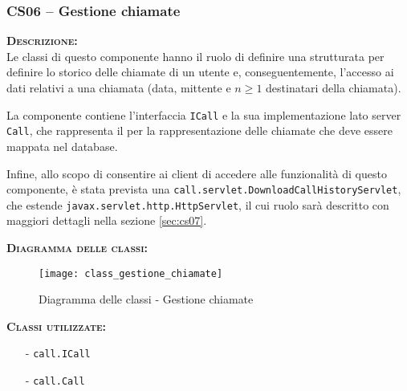 
\subsubsection{CS06 -- Gestione chiamate}\label{sec:cs06}
\begin{description}
  \item{\scshape\bfseries Descrizione:}\\
Le classi di questo componente hanno il ruolo di definire una strutturata   per definire lo storico delle chiamate di un utente e, conseguentemente, l'accesso ai dati relativi a una chiamata (data, mittente e $n\geq1$ destinatari della chiamata).

La componente contiene l'interfaccia \texttt{ICall} e la sua implementazione lato server \texttt{Call}, che rappresenta il  per la rappresentazione delle chiamate che deve essere mappata nel database.

Infine, allo scopo di consentire ai client di accedere alle funzionalità di questo componente, è stata prevista una  \texttt{call.servlet.DownloadCallHistoryServlet}, che estende \texttt{javax.servlet.http.HttpServlet}, il cui ruolo sarà descritto con maggiori dettagli nella sezione \vref{sec:cs07}.

  \item{\scshape\bfseries Diagramma delle classi:}
\begin{figure}[H]
  \centering
  \texttt{[image: class\_gestione\_chiamate]}
  \caption{Diagramma delle classi - Gestione chiamate}\label{fig:gestionechiamate}
\end{figure}

  \item{\scshape\bfseries Classi utilizzate:}\\
  \begin{itemize}[noitemsep,nolistsep]
    \item[-] \texttt{call.ICall}
    \item[-] \texttt{call.Call}
  \end{itemize}
\end{description}


